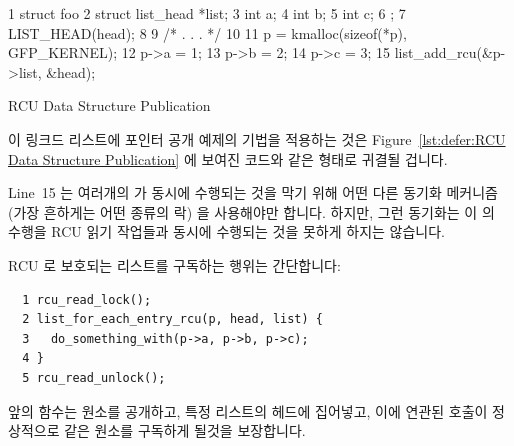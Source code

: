 \begin{listing}[tbp]
{ \scriptsize
\begin{verbbox}
  1 struct foo {
  2   struct list_head *list;
  3   int a;
  4   int b;
  5   int c;
  6 };
  7 LIST_HEAD(head);
  8
  9 /* . . . */
 10
 11 p = kmalloc(sizeof(*p), GFP_KERNEL);
 12 p->a = 1;
 13 p->b = 2;
 14 p->c = 3;
 15 list_add_rcu(&p->list, &head);
\end{verbbox}
}
\centering
\theverbbox
\caption{RCU Data Structure Publication}
\label{lst:defer:RCU Data Structure Publication}
\end{listing}

이 링크드 리스트에 포인터 공개 예제의 기법을 적용하는 것은
Figure~\ref{lst:defer:RCU Data Structure Publication} 에 보여진 코드와 같은
형태로 귀결될 겁니다.

Line~15 는 여러개의  가 동시에 수행되는 것을 막기 위해 어떤
다른 동기화 메커니즘 (가장 흔하게는 어떤 종류의 락) 을 사용해야만 합니다.
하지만, 그런 동기화는 이  의 수행을 RCU 읽기 작업들과 동시에
수행되는 것을 못하게 하지는 않습니다.

RCU 로 보호되는 리스트를 구독하는 행위는 간단합니다:

\vspace{5pt}
\begin{minipage}[t]{\columnwidth}
\scriptsize
\begin{verbatim}
  1 rcu_read_lock();
  2 list_for_each_entry_rcu(p, head, list) {
  3   do_something_with(p->a, p->b, p->c);
  4 }
  5 rcu_read_unlock();
\end{verbatim}
\end{minipage}
\vspace{5pt}

앞의  함수는 원소를 공개하고, 특정 리스트의 헤드에 집어넣고,
이에 연관된  호출이 정상적으로 같은 원소를
구독하게 될것을 보장합니다.
\iffalse

